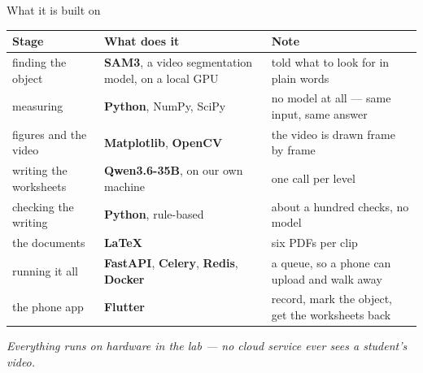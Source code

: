 \documentclass[aspectratio=169,11pt]{beamer}
\newcommand{\takeaway}[1]{\vfill{\small\itshape\color{cGrey}#1\par}}
\begin{document}
\begin{frame}{What it is built on}
\vspace{1pt}
\scriptsize
\renewcommand{\arraystretch}{1.32}
\begin{center}
\begin{tabular}{@{}p{3.4cm}p{4.5cm}p{4.6cm}@{}}
\toprule
\rowcolor{cInfra!10}
\textbf{Stage} & \textbf{What does it} & \textbf{Note} \\
\midrule
finding the object & \textbf{SAM3}, a video segmentation model, on a local GPU &
told what to look for in plain words \\
measuring & \textbf{Python}, NumPy, SciPy & no model at all --- same input, same answer \\
figures and the video & \textbf{Matplotlib}, \textbf{OpenCV} & the video is drawn frame by frame \\
writing the worksheets & \textbf{Qwen3.6-35B}, on our own machine & one call per level \\
checking the writing & \textbf{Python}, rule-based & about a hundred checks, no model \\
the documents & \textbf{\LaTeX} & six PDFs per clip \\
running it all & \textbf{FastAPI}, \textbf{Celery}, \textbf{Redis}, \textbf{Docker} & a queue, so a
phone can upload and walk away \\
the phone app & \textbf{Flutter} & record, mark the object, get the worksheets back \\
\bottomrule
\end{tabular}
\end{center}
\takeaway{Everything runs on hardware in the lab --- no cloud service ever sees a student's video.}
\end{frame}
\end{document}
